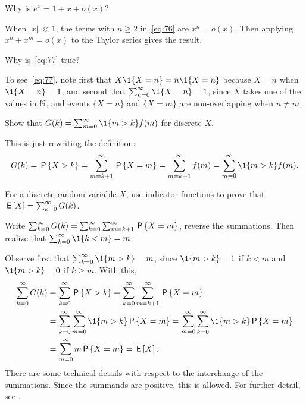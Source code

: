 \documentclass[queueing_book]{subfiles}
\begin{document}
\begin{exercise}\label{ex:87}
 Why is $e^{x} = 1 +x + o(x)$?
\begin{solution}
 When $|x|\ll 1$, the terms with $n\geq 2$ in~\cref{eq:76} are $x^n = o(x)$. Then applying $x^n + x^m = o(x)$ to the Taylor series gives the result.
\end{solution}
\end{exercise}

\begin{exercise}
 Why is~\cref{eq:77} true?
\begin{solution}
To see~\cref{eq:77}, note first that $X\1{X=n} = n\1{X=n}$ because $X=n$ when $\1{X=n} =1$, and second that $\sum_{n=0}^\infty \1{X=n} =1$, since $X$ takes one of the values in $\N$, and events $\{X=n\}$ and $\{X=m\}$ are non-overlapping when $n\neq m$. 
\end{solution}
\end{exercise}

\begin{exercise}\label{ex:l-105}
Show that $G(k) = \sum_{m=0}^\infty \1{m>k} f(m)$ for discrete $X$.
\begin{solution}
 This is just rewriting the definition:
\begin{equation*}
G(k) = \P{X>k} = \sum_{m=k+1}^\infty \P{X=m} = \sum_{m=k+1}^\infty f(m)=\sum_{m=0}^\infty \1{m>k}f(m).
\end{equation*}
\end{solution}
\end{exercise}

\begin{exercise}\label{ex:6}
  For a discrete random variable $X$, use indicator functions to prove that $\E X = \sum_{k=0}^\infty G(k)$.
\begin{hint}
Write 
$\sum_{k=0}^\infty G(k) = \sum_{k=0}^\infty \sum_{m=k+1}^\infty \P{X=m}$, reverse the summations. Then realize that $\sum_{k=0}^\infty \1{k<m} = m$. 
\end{hint}
\begin{solution}
Observe first that $\sum_{k=0}^\infty \1{m>k} = m$, since $\1{m>k}=1$ if $k<m$ and $\1{m>k} = 0$ if $k\geq m$. With this, 
\begin{align*}
\sum_{k=0}^\infty G(k) 
&= \sum_{k=0}^\infty \P{X>k} 
= \sum_{k=0}^\infty \sum_{m=k+1}^\infty \P{X=m} \\
& = \sum_{k=0}^\infty \sum_{m=0}^\infty \1{m>k} \P{X=m} 
= \sum_{m=0}^\infty \sum_{k=0}^\infty \1{m>k} \P{X=m} \\
&= \sum_{m=0}^\infty m\P{X=m} = \E X.
\end{align*}
There are some technical details with respect to the interchange of the summations.
Since the summands are positive, this is allowed.
For further detail, see \citet{capinski03:_probab_probl}.
\end{solution}
\end{exercise}
\end{document}
